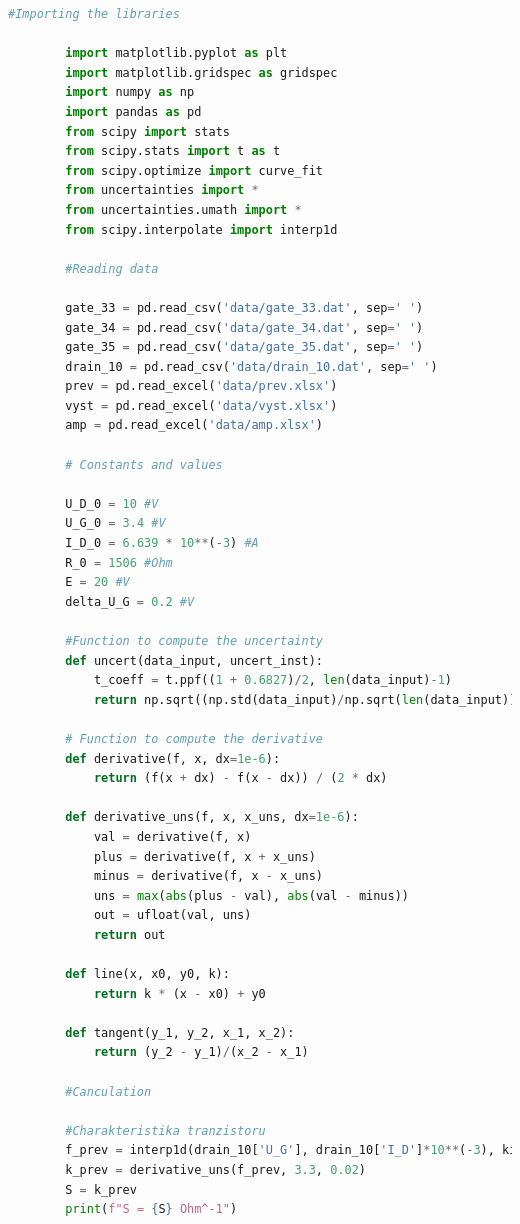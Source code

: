 \documentclass[a4paper,11pt]{article}
\begin{document}
    \begin{lstlisting}[language=Python, basicstyle=\tiny, breaklines=true, postbreak=\mbox{\textbackslashspace}]
        #Importing the libraries

        import matplotlib.pyplot as plt
        import matplotlib.gridspec as gridspec
        import numpy as np
        import pandas as pd
        from scipy import stats
        from scipy.stats import t as t 
        from scipy.optimize import curve_fit
        from uncertainties import *
        from uncertainties.umath import *
        from scipy.interpolate import interp1d

        #Reading data

        gate_33 = pd.read_csv('data/gate_33.dat', sep=' ')
        gate_34 = pd.read_csv('data/gate_34.dat', sep=' ')
        gate_35 = pd.read_csv('data/gate_35.dat', sep=' ')
        drain_10 = pd.read_csv('data/drain_10.dat', sep=' ')
        prev = pd.read_excel('data/prev.xlsx')
        vyst = pd.read_excel('data/vyst.xlsx')
        amp = pd.read_excel('data/amp.xlsx')

        # Constants and values

        U_D_0 = 10 #V
        U_G_0 = 3.4 #V
        I_D_0 = 6.639 * 10**(-3) #A
        R_0 = 1506 #Ohm
        E = 20 #V
        delta_U_G = 0.2 #V

        #Function to compute the uncertainty
        def uncert(data_input, uncert_inst):
            t_coeff = t.ppf((1 + 0.6827)/2, len(data_input)-1)
            return np.sqrt((np.std(data_input)/np.sqrt(len(data_input)))**2 + uncert_inst**2)*t_coeff

        # Function to compute the derivative
        def derivative(f, x, dx=1e-6):
            return (f(x + dx) - f(x - dx)) / (2 * dx)

        def derivative_uns(f, x, x_uns, dx=1e-6):
            val = derivative(f, x)
            plus = derivative(f, x + x_uns)
            minus = derivative(f, x - x_uns)
            uns = max(abs(plus - val), abs(val - minus))
            out = ufloat(val, uns)
            return out

        def line(x, x0, y0, k):
            return k * (x - x0) + y0

        def tangent(y_1, y_2, x_1, x_2):
            return (y_2 - y_1)/(x_2 - x_1)

        #Canculation

        #Charakteristika tranzistoru
        f_prev = interp1d(drain_10['U_G'], drain_10['I_D']*10**(-3), kind='cubic', fill_value="extrapolate")
        k_prev = derivative_uns(f_prev, 3.3, 0.02)
        S = k_prev 
        print(f"S = {S} Ohm^-1")



\end{lstlisting}
\end{document}
